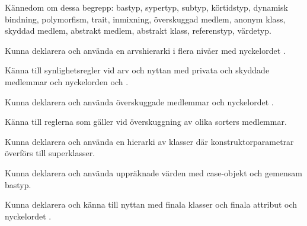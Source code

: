 

\item Kännedom om dessa begrepp:
bastyp,
sypertyp,
subtyp,
körtidstyp,
dynamisk bindning,
polymorfism,
trait,
inmixning,
överskuggad medlem,
anonym klass,
skyddad medlem,
abstrakt medlem,
abstrakt klass,
referenstyp,
värdetyp.

\item Kunna deklarera och använda en arvshierarki i flera nivåer med nyckelordet .

\item Känna till synlighetsregler vid arv och nyttan med privata och skyddade medlemmar och nyckelorden  och .


\item Kunna deklarera och använda överskuggade medlemmar och nyckelordet .

\item Känna till reglerna som gäller vid överskuggning av olika sorters medlemmar.

\item Kunna deklarera och använda en hierarki av klasser där konstruktorparametrar överförs till superklasser.

\item Kunna deklarera och använda uppräknade värden med case-objekt och gemensam bastyp.

\item Kunna deklarera och känna till nyttan med finala klasser och finala attribut och nyckelordet .





